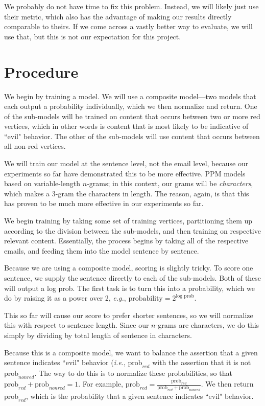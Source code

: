 \documentclass[11pt]{article}
\begin{document}
We probably do not have time to fix this problem. Instead, we will likely just use their metric, which also has the advantage of making our results directly comparable to theirs. If we come across a vastly better way to evaluate, we will use that, but this is not our expectation for this project.

\section{Procedure}\label{ch:overview}
We begin by training a model. We will use a composite model---two models that each output a probability individually, which we then normalize and return. One of the sub-models will be trained on content that occurs between two or more red vertices, which in other words is content that is most likely to be indicative of ``evil" behavior. The other of the sub-models will use content that occurs between all non-red vertices.

We will train our model at the sentence level, not the email level, because our experiments so far have demonstrated this to be more effective. PPM models based on variable-length $n$-grams; in this context, our grams will be \textit{characters}, which makes a 3-gram the characters in length. The reason, again, is that this has proven to be much more effective in our experiments so far.

We begin training by taking some set of training vertices, partitioning them up according to the division between the sub-models, and then training on respective relevant content. Essentially, the process begins by taking all of the respective emails, and feeding them into the model sentence by sentence.

Because we are using a composite model, scoring is slightly tricky. To score one sentence, we supply the sentence directly to each of the sub-models. Both of these will output a log prob. The first task is to turn this into a probability, which we do by raising it as a power over 2, \textit{e.g.}, $\text{probability} = 2^{\text{log prob}}$.

This so far will cause our score to prefer shorter sentences, so we will normalize this with respect to sentence length. Since our $n$-grams are characters, we do this simply by dividing by total length of sentence in characters.

Because this is a composite model, we want to balance the assertion that a given sentence indicates ``evil" behavior (\textit{i.e.}, $\text{prob}_{red}$ with the assertion that it is not $\text{prob}_{nonred}$. The way to do this is to normalize these probabilities, so that $\text{prob}_{red} + \text{prob}_{nonred} = 1$. For example, $\text{prob}_{red} = \frac{\text{prob}_{red}}{\text{prob}_{red} + \text{prob}_{nonred}}$. We then return $\text{prob}_{red}$, which is the probability that a given sentence indicates ``evil" behavior.
\end{document}
